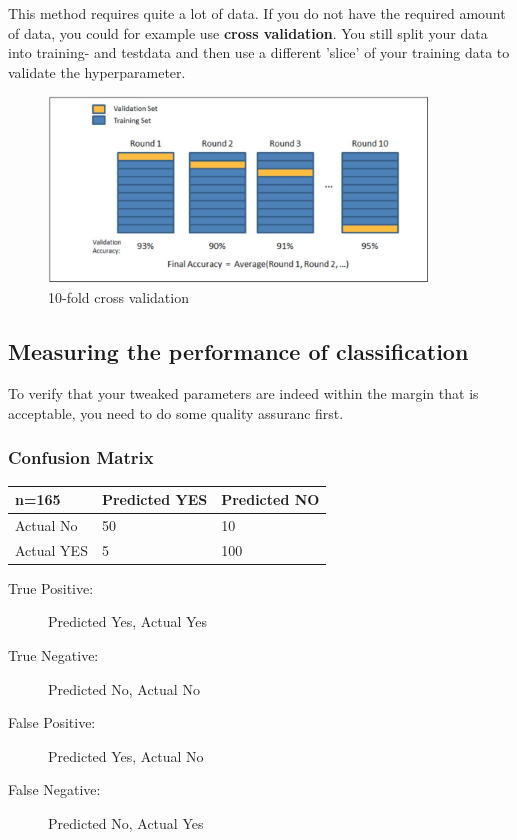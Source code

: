 \documentclass[a4paper, 11pt]{article}
\renewcommand*{\thead}[1]{\bfseries #1}
\begin{document}
This method requires quite a lot of data. If you do not have the required amount of data, you could for example use \textbf{cross validation}. You still split your data into training- and testdata and then use a different 'slice' of your training data to validate the hyperparameter.

\begin{figure}[htb!]
    \centering
    \includegraphics[keepaspectratio=true,width=0.9\textwidth]{cross_validation.png}
    \caption{10-fold cross validation}
    \label{fig:cross_validation}
\end{figure}

\subsection{Measuring the performance of classification}

To verify that your tweaked parameters are indeed within the margin that is acceptable, you need to do some quality assuranc first.

\subsubsection{Confusion Matrix}

\begin{minipage}{0.45\textwidth}
    \begin{tabular}{|p{1.5cm}|p{1.5cm}|p{1.5cm}|}
        \hline
        \thead{n=165} & Predicted YES & Predicted NO \\
        \hline
        Actual No & 50 & 10 \\
        \hline
        Actual YES & 5 & 100  \\
        \hline
    \end{tabular}
\end{minipage}\hfill
\begin{minipage}{0.55\textwidth}
    \begin{description}
        \item[True Positive: ] Predicted Yes, Actual Yes
        \item[True Negative: ] Predicted No, Actual No
        \item[False Positive: ] Predicted Yes, Actual No
        \item[False Negative: ] Predicted No, Actual Yes
    \end{description}
\end{minipage}
\end{document}
